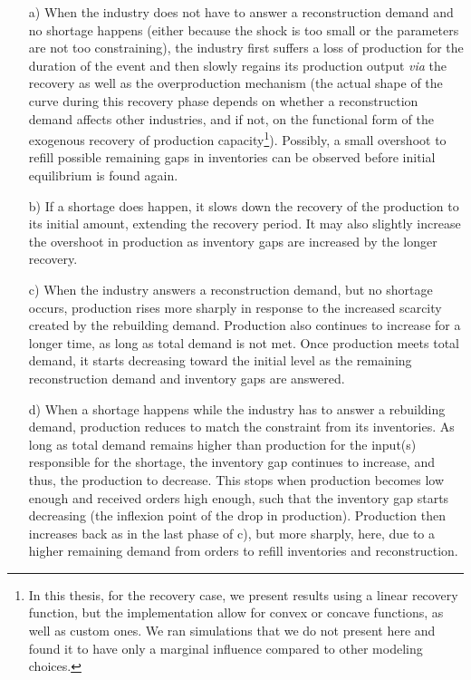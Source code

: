 \begin{enumerate}
\item[a)] When the industry does not have to answer a reconstruction demand and
  no shortage happens (either because the shock is too small or the parameters
  are not too constraining), the industry first suffers a loss of production for the
  duration of the event and then slowly regains its production output \emph{via} the
  recovery as well as the overproduction mechanism (the actual shape of the
  curve during this recovery phase depends on whether a reconstruction demand
  affects other industries, and if not, on the functional form of the exogenous
  recovery of production capacity\footnote{In this thesis, for the recovery case, we present results
    using a linear recovery function, but the implementation allow for convex or
  concave functions, as well as custom ones. We ran simulations that we do not
present here and found it to have only a marginal influence compared to
other modeling choices.}). Possibly, a small overshoot to refill possible
  remaining gaps in inventories can be observed before initial equilibrium is found again.
\item[b)] If a shortage does happen, it slows down the recovery of the production
to its initial amount, extending the recovery period. It
may also slightly increase the overshoot in production as inventory
gaps are increased by the longer recovery.
\item[c)] When the industry answers a reconstruction demand, but no shortage occurs,
production rises more sharply in response to the increased scarcity created
by the rebuilding demand. Production also continues to increase for a longer time, as
long as total demand is not met. Once production meets total demand, it starts
decreasing toward the initial level as the remaining reconstruction demand and
inventory gaps are answered.
\item[d)] When a shortage happens while the industry has to answer a rebuilding
  demand, production reduces to match the constraint from its inventories.
As long as total demand remains higher than production for the input(s)
responsible for the shortage, the inventory gap continues to increase,
and thus, the production to decrease. This stops when production becomes low enough
and received orders high enough, such that the inventory gap starts decreasing
(the inflexion point of the drop in production).
Production then increases back as in the last phase of c), but more sharply, here,
due to a higher remaining demand from orders to refill inventories and reconstruction.
\end{enumerate}

